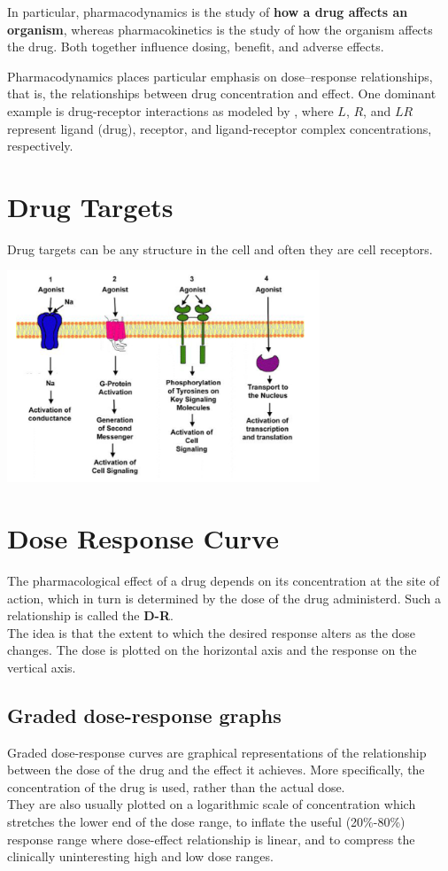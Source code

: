 \documentclass{book}
\begin{document}
In particular, pharmacodynamics is the study of \textbf{how a drug affects an organism}, whereas pharmacokinetics is the study of how the organism affects the drug. 
Both together influence dosing, benefit, and adverse effects. 

Pharmacodynamics places particular emphasis on dose–response relationships, that is, the relationships between drug concentration and effect.
One dominant example is drug-receptor interactions as modeled by , where $L$, $R$, and $LR$ represent ligand (drug), receptor, and ligand-receptor complex concentrations, respectively. 

\section{Drug Targets}
Drug targets can be any structure in the cell and often they are cell receptors.

\includegraphics[width=0.7\textwidth, center]{images/image12.png}

\section{Dose Response Curve}
The pharmacological effect of a drug depends on its concentration at the site of action, which in turn is determined by the dose of the drug administerd.
Such a relationship is called the \textbf{D-R}.
\\
The idea is that the extent to which the desired response alters as the dose changes.
The dose is plotted on the horizontal axis and the response on the vertical axis.

\subsection{Graded dose-response graphs}
Graded dose-response curves are graphical representations of the relationship between the dose of the drug and the effect it achieves. 
More specifically, the concentration of the drug is used, rather than the actual dose.
\\
They are also usually plotted on a logarithmic scale of concentration which stretches the lower end of the dose range, to inflate the useful (20\%-80\%) response range where dose-effect relationship is linear, and to compress the clinically uninteresting high and low dose ranges.
\end{document}
